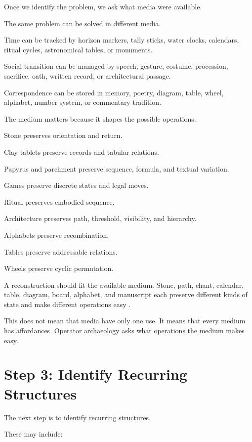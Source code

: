 \documentclass[11pt]{book}
\begin{document}
Once we identify the problem, we ask what media were available.

The same problem can be solved in different media.

Time can be tracked by horizon markers, tally sticks, water clocks, calendars, ritual cycles, astronomical tables, or monuments.

Social transition can be managed by speech, gesture, costume, procession, sacrifice, oath, written record, or architectural passage.

Correspondence can be stored in memory, poetry, diagram, table, wheel, alphabet, number system, or commentary tradition.

The medium matters because it shapes the possible operations.

Stone preserves orientation and return.

Clay tablets preserve records and tabular relations.

Papyrus and parchment preserve sequence, formula, and textual variation.

Games preserve discrete states and legal moves.

Ritual preserves embodied sequence.

Architecture preserves path, threshold, visibility, and hierarchy.

Alphabets preserve recombination.

Tables preserve addressable relations.

Wheels preserve cyclic permutation.

A reconstruction should fit the available medium. Stone, path, chant, calendar, table, diagram, board, alphabet, and manuscript each preserve different kinds of state and make different operations easy \cite{Yates1966ArtMemory,Ruggles2005AncientAstronomy,Murray1952BoardGames,Kahn1996Codebreakers}.

This does not mean that media have only one use. It means that every medium has affordances. Operator archaeology asks what operations the medium makes easy.

\section{Step 3: Identify Recurring Structures}

The next step is to identify recurring structures.

These may include:
\end{document}
